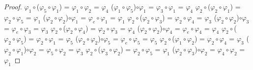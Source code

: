 \documentclass[10pt,a4paper,oneside]{article}
\begin{document}
\begin{proof}
					\newline
					$\varphi_{1}\circ$($\varphi_{5}\circ\varphi_{1}$) = $\varphi_{1}\circ\varphi_{2}$ = $\varphi_{4}$
					\newline
					($\varphi_{1}\circ\varphi_{5}$)$\circ\varphi_{1}$ = $\varphi_{3}\circ\varphi_{1}$ = $\varphi_{4}$
					\newline
					\newline
					$\varphi_{2}\circ$($\varphi_{2}\circ\varphi_{1}$) = $\varphi_{2}\circ\varphi_{5}$ = $\varphi_{1}$
					\newline
					($\varphi_{2}\circ\varphi_{2}$)$\circ\varphi_{1}$ = $\varphi_{e}\circ\varphi_{1}$ = $\varphi_{1}$
					\newline
					\newline
					$\varphi_{2}\circ$($\varphi_{2}\circ\varphi_{3}$) = $\varphi_{2}\circ\varphi_{4}$ = $\varphi_{3}$
					\newline
					($\varphi_{2}\circ\varphi_{2}$)$\circ\varphi_{3}$ = $\varphi_{e}\circ\varphi_{3}$ = $\varphi_{3}$
					\newline
					\newline
					$\varphi_{2}\circ$($\varphi_{2}\circ\varphi_{4}$) = $\varphi_{2}\circ\varphi_{3}$ = $\varphi_{4}$
					\newline
					($\varphi_{2}\circ\varphi_{2}$)$\circ\varphi_{4}$ = $\varphi_{e}\circ\varphi_{4}$ = $\varphi_{4}$
					\newline
					\newline
					$\varphi_{2}\circ$($\varphi_{2}\circ\varphi_{5}$) = $\varphi_{2}\circ\varphi_{1}$ = $\varphi_{5}$
					\newline
					($\varphi_{2}\circ\varphi_{2}$)$\circ\varphi_{5}$ = $\varphi_{e}\circ\varphi_{5}$ = $\varphi_{5}$
					\newline
					\newline
					$\varphi_{2}\circ$($\varphi_{1}\circ\varphi_{2}$) = $\varphi_{2}\circ\varphi_{4}$ = $\varphi_{3}$
					\newline
					($\varphi_{2}\circ\varphi_{1}$)$\circ\varphi_{2}$ = $\varphi_{5}\circ\varphi_{2}$ = $\varphi_{3}$
					\newline
					\newline
					$\varphi_{2}\circ$($\varphi_{3}\circ\varphi_{2}$) = $\varphi_{2}\circ\varphi_{5}$ = $\varphi_{1}$
					\newline
					($\varphi_{2}\circ\varphi_{3}$)$\circ\varphi_{2}$ = $\varphi_{4}\circ\varphi_{2}$ = $\varphi_{1}$
					\newline

\end{proof}
\end{document}

